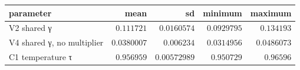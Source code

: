 \begin{tabular}{lrrrr}
\toprule
parameter & mean & sd & minimum & maximum \\
\midrule
V2 shared γ & $0.111721$ & $0.0160574$ & $0.0929795$ & $0.134193$ \\
V4 shared γ, no multiplier & $0.0380007$ & $0.006234$ & $0.0314956$ & $0.0486073$ \\
C1 temperature τ & $0.956959$ & $0.00572989$ & $0.950729$ & $0.96596$ \\
\bottomrule
\end{tabular}
